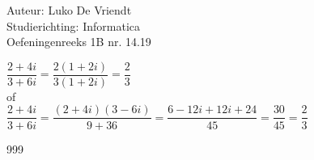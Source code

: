 \documentclass[a4paper]{article}
\begin{document}
\noindent \large Auteur: Luko De Vriendt\\
\noindent \large Studierichting: Informatica\\
\noindent \large Oefeningenreeks 1B nr. 14.19\\

\medskip

\normalsize

$ \dfrac{2+4i}{3+6i} = \dfrac{2(1+2i)}{3(1+2i)} = \dfrac{2}{3} $ \\

of \\

$ \dfrac{2+4i}{3+6i} = \dfrac{(2+4i)(3-6i)}{9 +36} = \dfrac{6 -12i +12i +24}{45} = \dfrac{30}{45} = \dfrac{2}{3} $ \\
	
\begin{thebibliography}{999}
\end{thebibliography}
\end{document}
